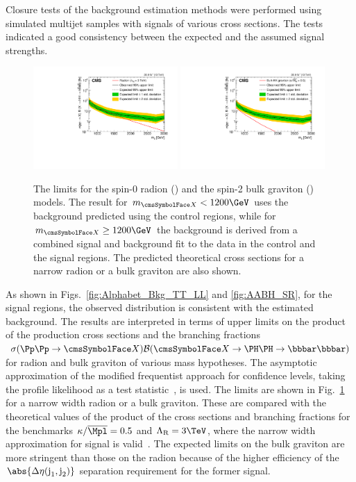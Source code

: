 Closure tests of the background estimation methods were performed using simulated multijet samples with signals of various cross sections. The tests indicated a good consistency between the expected and the assumed signal strengths.


\begin{figure}[htb]
  \centering
  \includegraphics[width=0.49\textwidth]{B2G-16-026/Figure_009-a.pdf}
  \includegraphics[width=0.49\textwidth]{B2G-16-026/Figure_009-b.pdf}
  \caption{The limits for the spin-0 radion (\cmsLeft) and the
    spin-2 bulk graviton (\cmsRight) models. The result for $\mx < 1200\GeV$ uses the background predicted using the control regions, while for $\mx \ge 1200\GeV$ the background is derived from a combined signal and background fit to the data in the control and the signal regions. The
    predicted theoretical cross sections for a narrow radion or a bulk
    graviton are also
    shown.}
  \label{fig:lim_rad_grav_comb}
\end{figure}

As shown in Figs.~\ref{fig:Alphabet_Bkg_TT_LL}
and \ref{fig:AABH_SR}, for the signal regions, the observed \mjjs distribution is consistent with the estimated background.
The results are interpreted in terms of upper limits on the
product of the production cross sections and the branching fractions
$\sigma(\Pp\Pp \to \PX) \mathcal{B}(\PX \to \PH\PH \to \bbbar \bbbar)$
for radion and bulk graviton of various mass hypotheses.
The asymptotic approximation of the modified frequentist approach for confidence levels, taking the profile likelihood as a test
statistic~\cite{bib:CLS1,bib:CLS2,AsympCLs}, is used.
The limits are shown in Fig.~\ref{fig:lim_rad_grav_comb} for  a narrow width radion or a bulk
graviton. These are compared with the theoretical values of the product of the cross sections and branching fractions for the benchmarks  $\kappa/\overline{\Mpl} = 0.5$ and $\LambdaR = 3\TeV$, where the narrow width approximation for signal is valid~\cite{Oliveira:2014kla}. The expected limits on the bulk graviton are more stringent than those on the radion because of the higher efficiency of the $\abs{\DeltaEta}$ separation requirement for the former signal.


